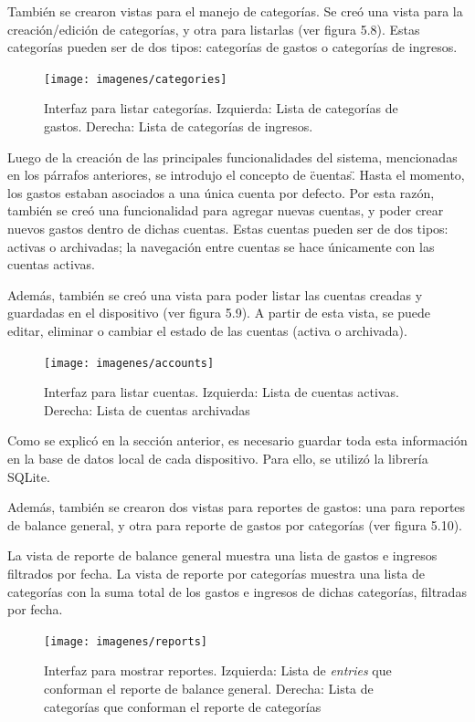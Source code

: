 También se crearon vistas para el manejo de categorías. Se creó una vista para la creación/edición de categorías, y otra para listarlas (ver figura 5.8). Estas categorías pueden ser de dos tipos: categorías de gastos o categorías de ingresos.

\begin{figure}[ht]
  \centering
  \texttt{[image: imagenes/categories]}
  \caption{Interfaz para listar categorías. Izquierda: Lista de categorías de gastos. Derecha: Lista de categorías de ingresos.}
  \label{fig:interfazListarCategorias}
\end{figure}

Luego de la creación de las principales funcionalidades del sistema, mencionadas en los párrafos anteriores, se introdujo el concepto de \"cuentas\". Hasta el momento, los gastos estaban asociados a una única cuenta por defecto. Por esta razón, también se creó una funcionalidad para agregar nuevas cuentas, y poder crear nuevos gastos dentro de dichas cuentas. Estas cuentas pueden ser de dos tipos: activas o archivadas; la navegación entre cuentas se hace únicamente con las cuentas activas. 

Además, también se creó una vista para poder listar las cuentas creadas y guardadas en el dispositivo (ver figura 5.9). A partir de esta vista, se puede editar, eliminar o cambiar el estado de las cuentas (activa o archivada).


\begin{figure}[ht]
  \centering
  \texttt{[image: imagenes/accounts]}
  \caption{Interfaz para listar cuentas. Izquierda: Lista de cuentas activas. Derecha: Lista de cuentas archivadas}
  \label{fig:interfazListarCuentas}
\end{figure}

Como se explicó en la sección anterior, es necesario guardar toda esta información en la base de datos local de cada dispositivo. Para ello, se utilizó la librería SQLite.

Además, también se crearon dos vistas para reportes de gastos: una para reportes de balance general, y otra para reporte de gastos por categorías (ver figura 5.10).

La vista de reporte de balance general muestra una lista de gastos e ingresos filtrados por fecha. La vista de reporte por categorías muestra una lista de categorías con la suma total de los gastos e ingresos de dichas categorías, filtradas por fecha.

\begin{figure}[ht]
  \centering
  \texttt{[image: imagenes/reports]}
  \caption{Interfaz para mostrar reportes. Izquierda: Lista de \textit{entries} que conforman el reporte de balance general. Derecha: Lista de categorías que conforman el reporte de categorías}
  \label{fig:interfazReportes}
\end{figure}


